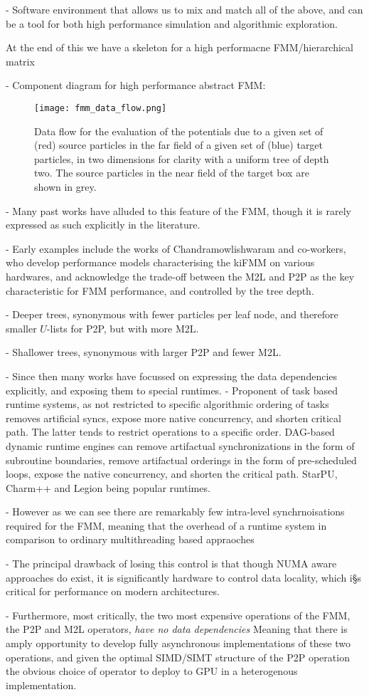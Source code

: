 - Software environment that allows us to mix and match all of the above, and can be a tool for both high performance simulation and algorithmic exploration.

At the end of this we have a skeleton for a high performacne FMM/hierarchical matrix

- Component diagram for high performance abstract FMM:

\begin{figure}[h]
    \texttt{[image: fmm\_data\_flow.png]}
    \caption{Data flow for the evaluation of the potentials due to a given set of (red) source particles in the far field of a given set of (blue) target particles, in two dimensions for clarity with a uniform tree of depth two. The source particles in the near field of the target box are shown in grey.}
    \label{fig:chpt:fmm:data_flow}
\end{figure}

- Many past works have alluded to this feature of the FMM, though it is rarely expressed as such explicitly in the literature.

- Early examples include the works of Chandramowlishwaram and co-workers, who develop performance models characterising the kiFMM on various hardwares, and acknowledge the trade-off between the M2L and P2P as the key characteristic for FMM performance, and controlled by the tree depth.

- Deeper trees, synonymous with fewer particles per leaf node, and therefore smaller $U$-lists for P2P, but with more M2L.

- Shallower trees, synonymous with larger P2P and fewer M2L.

- Since then many works have focussed on expressing the data dependencies explicitly, and exposing them to special runtimes. - Proponent of task based runtime systems, as not restricted to specific algorithmic ordering of tasks removes artificial syncs, expose more native concurrency, and shorten critical path. The latter tends to restrict operations to a specific order. DAG-based dynamic runtime engines can remove artifactual synchronizations in the form of subroutine boundaries, remove artifactual orderings in the form of pre-scheduled loops, expose the native concurrency, and shorten the critical path. StarPU, Charm++ and Legion being popular runtimes.

- However as we can see there are remarkably few intra-level synchrnoisations required for the FMM, meaning that the overhead of a runtime system in comparison to ordinary multithreading based appraoches

- The principal drawback of losing this control is that though NUMA aware approaches do exist, it is significantly hardware to control data locality, which i§s critical for performance on modern architectures.

- Furthermore, most critically, the two most expensive operations of the FMM, the P2P and M2L operators, \textit{have no data dependencies} Meaning that there is amply opportunity to develop fully asynchronous implementations of these two operations, and given the optimal SIMD/SIMT structure of the P2P operation the obvious choice of operator to deploy to GPU in a heterogenous implementation.


